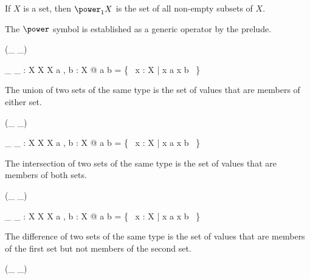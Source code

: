 \documentclass[draft,a4paper,10pt,wd]{isov2}
\begin{document}
If $X$ is a set, then $\power_1 X$ is the set of all non-empty subsets of $X$.

\begin{note}
The $\power$ symbol is established as a generic operator by the prelude.
\end{note}


\begin{zed}
 \leftassoc (\_ \cup \_)
\end{zed}

\begin{gendef}[X]
\_ \cup \_ : \power X \cross \power X \fun \power X
\where
\forall a , b : \power X @ a \cup b = \{~ x : X | x \in a \lor x \in b ~\}
\end{gendef}

The union of two sets of the same type is the set of values
that are members of either set.


\begin{zed}
 \leftassoc (\_ \cap \_)
\end{zed}

\begin{gendef}[X]
\_ \cap \_ : \power X \cross \power X \fun \power X
\where
\forall a , b : \power X @ a \cap b = \{~ x : X | x \in a \land x \in b ~\}
\end{gendef}

The intersection of two sets of the same type is the set of
values that are members of both sets.


\begin{zed}
 \leftassoc (\_ \setminus \_)
\end{zed}

\begin{gendef}[X]
\_ \setminus \_ : \power X \cross \power X \fun \power X
\where
\forall a , b : \power X @ a \setminus b = \{~ x : X | x \in a \land x \notin b ~\}
\end{gendef}

The difference of two sets of the same type is the set of
values that are members of the first set but not members of the second set.


\begin{zed}
 \leftassoc (\_ \symdiff \_)
\end{zed}
\end{document}
